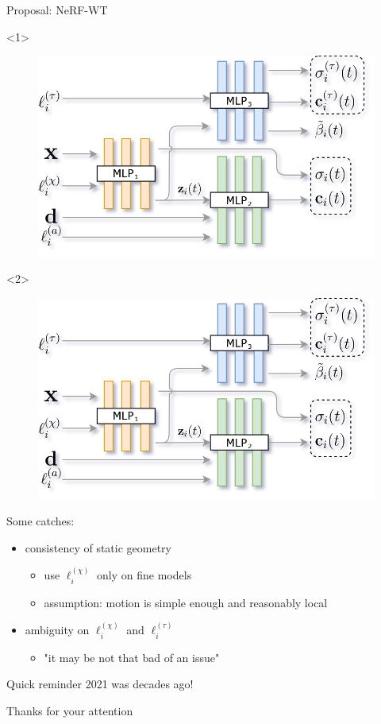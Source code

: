 \documentclass[aspectratio=1610]{beamer}
\begin{document}
\begin{frame}{Proposal: NeRF-WT}
    \begin{onlyenv}<1>
        \begin{figure}
            \includegraphics[width=.7\textwidth]{nerfwt-architecture.png}
        \end{figure}
    \end{onlyenv}
    \begin{onlyenv}<2>
        \begin{figure}
            \includegraphics[width=.4\textwidth]{nerfwt-architecture.png}
        \end{figure}
        Some catches:
        \begin{itemize}
            \item consistency of static geometry
            \begin{itemize}
                \item use \(\ell_i^{(\chi)}\) only on fine models
                \item assumption: motion is simple enough and reasonably local
            \end{itemize}
            \item ambiguity on \(\ell_i^{(\chi)}\) and \(\ell_i^{(\tau)}\)
            \begin{itemize}
                \item "it may be not that bad of an issue"
            \end{itemize}
        \end{itemize}
    \end{onlyenv}
\end{frame}

\begin{frame}{Quick reminder}
    2021 was decades ago!
    \begin{figure}
    \end{figure}
\end{frame}

\begin{frame}
    \begin{center}
        Thanks for your attention
    \end{center}
\end{frame}
\end{document}

